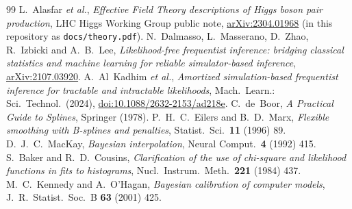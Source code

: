 \documentclass[11pt]{article}
\newcommand{\code}[1]{\texttt{#1}}
\begin{document}
\begin{thebibliography}{99}
 L.~Alasfar \emph{et al.}, \emph{Effective Field Theory descriptions of Higgs
  boson pair production}, LHC Higgs Working Group public note,
  \href{https://arxiv.org/abs/2304.01968}{arXiv:2304.01968} (in this repository as
  \code{docs/theory.pdf}).
 N.~Dalmasso, L.~Masserano, D.~Zhao, R.~Izbicki and A.~B.~Lee, \emph{Likelihood-free
  frequentist inference: bridging classical statistics and machine learning for reliable
  simulator-based inference}, \href{https://arxiv.org/abs/2107.03920}{arXiv:2107.03920}.
 A.~Al~Kadhim \emph{et al.}, \emph{Amortized simulation-based frequentist
  inference for tractable and intractable likelihoods}, Mach.\ Learn.: Sci.\ Technol.\ (2024),
  \href{https://iopscience.iop.org/article/10.1088/2632-2153/ad218e}{doi:10.1088/2632-2153/ad218e}.
 C.~de~Boor, \emph{A Practical Guide to Splines}, Springer (1978).
 P.~H.~C.~Eilers and B.~D.~Marx, \emph{Flexible smoothing with B-splines and
  penalties}, Statist.\ Sci.\ \textbf{11} (1996) 89.
 D.~J.~C.~MacKay, \emph{Bayesian interpolation}, Neural Comput.\ \textbf{4}
  (1992) 415.
 S.~Baker and R.~D.~Cousins, \emph{Clarification of the use of chi-square
  and likelihood functions in fits to histograms}, Nucl.\ Instrum.\ Meth.\ \textbf{221} (1984) 437.
 M.~C.~Kennedy and A.~O'Hagan, \emph{Bayesian calibration of computer
  models}, J.\ R.\ Statist.\ Soc.\ B \textbf{63} (2001) 425.
\end{thebibliography}
\end{document}
